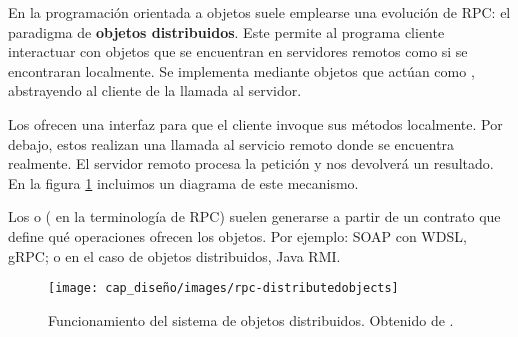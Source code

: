 En la programación orientada a objetos suele emplearse una evolución de RPC: el paradigma de \textbf{objetos distribuidos}. \cite{tanenbaumChapter10Distributed2007} Este permite al programa cliente interactuar con objetos que se encuentran en servidores remotos como si se encontraran localmente. Se implementa mediante objetos que actúan como , abstrayendo al cliente de la llamada al servidor.

Los  ofrecen una interfaz para que el cliente invoque sus métodos localmente. Por debajo, estos realizan una llamada al servicio remoto donde se encuentra realmente. El servidor remoto procesa la petición y nos devolverá un resultado. En la figura \ref{fig:rpc-distributedobjects} incluimos un diagrama de este mecanismo.

Los  o ( en la terminología de RPC) suelen generarse a partir de un contrato que define qué operaciones ofrecen los objetos. Por ejemplo: SOAP con WDSL, gRPC; o en el caso de objetos distribuidos, Java RMI.

\begin{figure}[htb]
  \centering
  \texttt{[image: cap\_diseño/images/rpc-distributedobjects]}
  \caption[Funcionamiento del sistema de objetos distribuidos.]{Funcionamiento del sistema de objetos distribuidos. Obtenido de \cite{tanenbaumChapter10Distributed2007}.}
  \label{fig:rpc-distributedobjects}
\end{figure}

